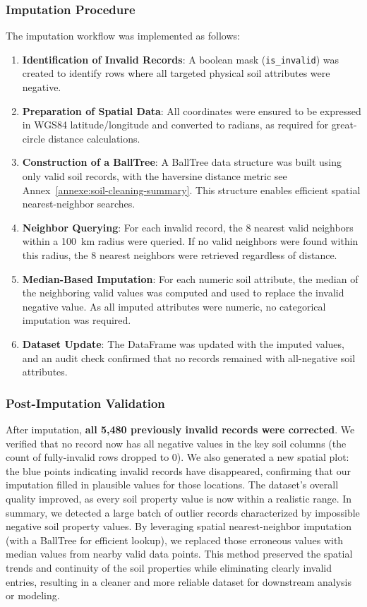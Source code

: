 \subsubsection{Imputation Procedure}

The imputation workflow was implemented as follows:

\begin{enumerate}
    \item \textbf{Identification of Invalid Records}: A boolean mask (\texttt{is\_invalid}) was created to identify rows where all targeted physical soil attributes were negative.
    \item \textbf{Preparation of Spatial Data}: All coordinates were ensured to be expressed in WGS84 latitude/longitude and converted to radians, as required for great-circle distance calculations.
    \item \textbf{Construction of a BallTree}: A BallTree data structure was built using only valid soil records, with the haversine distance metric see Annex~\ref{annexe:soil-cleaning-summary}. This structure enables efficient spatial nearest-neighbor searches.
    \item \textbf{Neighbor Querying}: For each invalid record, the 8 nearest valid neighbors within a 100~km radius were queried. If no valid neighbors were found within this radius, the 8 nearest neighbors were retrieved regardless of distance.
    \item \textbf{Median-Based Imputation}: For each numeric soil attribute, the median of the neighboring valid values was computed and used to replace the invalid negative value. As all imputed attributes were numeric, no categorical imputation was required.
    \item \textbf{Dataset Update}: The DataFrame was updated with the imputed values, and an audit check confirmed that no records remained with all-negative soil attributes.
\end{enumerate}

\subsubsection{Post-Imputation Validation}
After imputation, \textbf{ all 5,480 previously invalid records were corrected}. We verified that no record now has all negative values in the key soil columns (the count of fully-invalid rows dropped to 0). We also generated a new spatial plot: the blue points indicating invalid records have disappeared, confirming that our imputation filled in plausible values for those locations. The dataset's overall quality improved, as every soil property value is now within a realistic range.
In summary, we detected a large batch of outlier records characterized by impossible negative soil property values. By leveraging spatial nearest-neighbor imputation (with a BallTree for efficient lookup), we replaced those erroneous values with median values from nearby valid data points. This method preserved the spatial trends and continuity of the soil properties while eliminating clearly invalid entries, resulting in a cleaner and more reliable dataset for downstream analysis or modeling.

